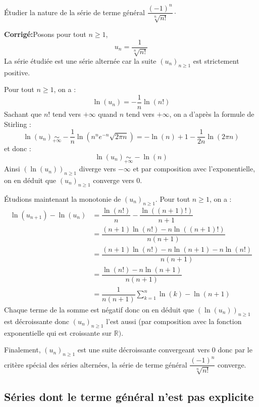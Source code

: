\documentclass[a4paper,twoside,french,10pt]{VcCours}
\newcommand{\corr}{\textbf{Corrigé:}}
\begin{document}
\medskip

\begin{Exercice}{} Étudier la nature de la série de terme général $\dfrac{(-1)^n}{\sqrt[n]{n!}} \cdot$
\end{Exercice}

\corr Posons pour tout $n \geq 1$,
$$ u_n = \dfrac{1}{\sqrt[n]{n!}}$$
La série étudiée est une série alternée car la suite $(u_n)_{n \geq 1}$ est strictement positive. 

\noindent Pour tout $n \geq 1$, on a :
$$ \ln(u_n) = - \dfrac{1}{n} \ln(n!)$$
Sachant que $n!$ tend vers $+ \infty$ quand $n$ tend vers $+ \infty$, on a d'après la formule de Stirling :
$$ \ln(u_n) \underset{+ \infty}{\sim} - \dfrac{1}{n} \ln(n^n e^{-n} \sqrt{2 \pi n}) = - \ln(n) +1 - \dfrac{1}{2n} \ln(2 \pi n)$$
et donc :
$$ \ln(u_n) \underset{+ \infty}{\sim} - \ln(n)$$
Ainsi $(\ln(u_n))_{n \geq 1}$ diverge vers $- \infty$ et par composition avec l'exponentielle, on en déduit que $(u_n)_{n \geq 1}$ converge vers $0$.

\medskip

\noindent Étudions maintenant la monotonie de $(u_n)_{n \geq 1}$. Pour tout $n \geq 1$, on a :
\begin{align*}
\ln(u_{n+1})-\ln(u_n) & = \dfrac{\ln(n!)}{n} - \dfrac{\ln((n+1)!)}{n+1} \\
& = \dfrac{(n+1) \ln(n!)-n \ln((n+1)!)}{n(n+1)} \\
& = \dfrac{(n+1)\ln(n!)-n \ln(n+1)-n \ln(n!)}{n(n+1)} \\
& = \dfrac{\ln(n!)-n \ln(n+1)}{n(n+1)} \\
& = \dfrac{1}{n(n+1)} \sum_{k=1}^n \ln(k) - \ln(n+1) 
\end{align*}
Chaque terme de la somme est négatif donc on en déduit que $(\ln(u_n))_{n \geq 1}$ est décroissante donc $(u_n)_{n \geq 1}$ l'est aussi (par composition avec la fonction exponentielle qui est croissante sur $\mathbb{R})$.

\medskip

\noindent Finalement, $(u_n)_{n \geq 1}$ est une suite décroissante convergeant vers $0$ donc par le critère spécial des séries alternées, la série de terme général $\dfrac{(-1)^n}{\sqrt[n]{n!}}$ converge.

\medskip



\subsection{Séries dont le terme général n'est pas explicite}
\end{document}
